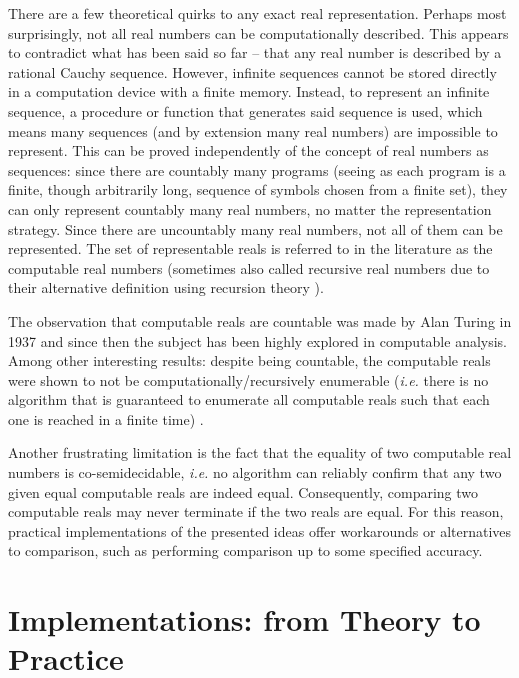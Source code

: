 There are a few theoretical quirks to any exact real representation. Perhaps most surprisingly, not all real numbers can be computationally described. This appears to contradict what has been said so far -- that any real number is described by a rational Cauchy sequence. However, infinite sequences cannot be stored directly in a computation device with a finite memory. Instead, to represent an infinite sequence, a procedure or function that generates said sequence is used, which means many sequences (and by extension many real numbers) are impossible to represent. This can be proved independently of the concept of real numbers as sequences: since there are countably many programs (seeing as each program is a finite, though arbitrarily long, sequence of symbols chosen from a finite set), they can only represent countably many real numbers, no matter the representation strategy. Since there are uncountably many real numbers, not all of them can be represented. The set of representable reals is referred to in the literature as the computable real numbers (sometimes also called recursive real numbers due to their alternative definition using recursion theory \cite{Odi89}). %

The observation that computable reals are countable was made by Alan Turing in 1937 \cite{Tur37} and since then the subject has been highly explored in computable analysis. Among other interesting results: despite being countable, the computable reals were shown to not be computationally/recursively enumerable (\textit{i.e.} there is no algorithm that is guaranteed to enumerate all computable reals such that each one is reached in a finite time) \cite{Odi89}.

Another frustrating limitation is the fact that the equality of two computable real numbers is co-semidecidable, \textit{i.e.} no algorithm can reliably confirm that any two given equal computable reals are indeed equal. Consequently, comparing two computable reals may never terminate if the two reals are equal. For this reason, practical implementations of the presented ideas offer workarounds or alternatives to comparison, such as performing comparison up to some specified accuracy.



\section{Implementations: from Theory to Practice}
\label{sec:practice}

